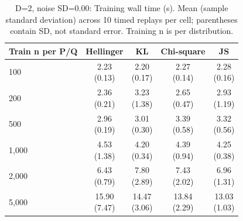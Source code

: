 
\begin{table}[t]
\centering
\small
\setlength{\tabcolsep}{4pt}
\caption{D=2, noise SD=0.00: Training wall time (s). Mean (sample standard deviation) across 10 timed replays per cell; parentheses contain SD, not standard error. Training n is per distribution.}
\label{tab:sim-d-2-noise-sd-0-00-training-wall-time-s}
\begin{tabular}{lcccc}
\toprule
Train n per P/Q & Hellinger & KL & Chi-square & JS \\
\midrule
100 & \shortstack{2.23\\(0.13)} & \shortstack{2.20\\(0.17)} & \shortstack{2.27\\(0.14)} & \shortstack{2.28\\(0.16)} \\
200 & \shortstack{2.36\\(0.21)} & \shortstack{3.23\\(1.38)} & \shortstack{2.65\\(0.47)} & \shortstack{2.93\\(1.19)} \\
500 & \shortstack{2.96\\(0.19)} & \shortstack{3.01\\(0.30)} & \shortstack{3.39\\(0.58)} & \shortstack{3.32\\(0.56)} \\
1,000 & \shortstack{4.53\\(1.38)} & \shortstack{4.20\\(0.34)} & \shortstack{4.39\\(0.94)} & \shortstack{4.25\\(0.38)} \\
2,000 & \shortstack{6.43\\(0.79)} & \shortstack{7.80\\(2.89)} & \shortstack{7.43\\(2.02)} & \shortstack{6.96\\(1.31)} \\
5,000 & \shortstack{15.90\\(7.47)} & \shortstack{14.47\\(3.06)} & \shortstack{13.84\\(2.29)} & \shortstack{13.03\\(1.03)} \\
\bottomrule
\end{tabular}
\end{table}

